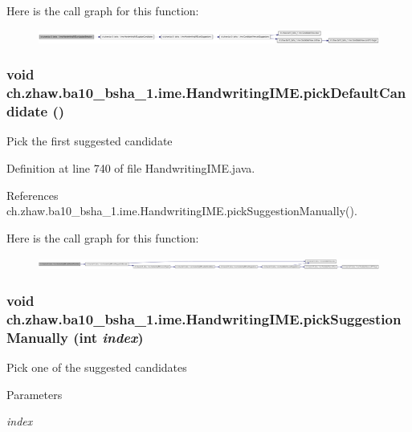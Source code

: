 Here is the call graph for this function:\nopagebreak
\begin{figure}[H]
\begin{center}
\leavevmode
\includegraphics[width=420pt]{classch_1_1zhaw_1_1ba10__bsha__1_1_1ime_1_1HandwritingIME_a372883c8da0f8e41f6acb0d169fc5b6e_cgraph}
\end{center}
\end{figure}
\hypertarget{classch_1_1zhaw_1_1ba10__bsha__1_1_1ime_1_1HandwritingIME_a6e2e375b97933b90f110199def80abfe}{
\subsubsection[{pickDefaultCandidate}]{\setlength{\rightskip}{0pt plus 5cm}void ch.zhaw.ba10\_\-bsha\_\-1.ime.HandwritingIME.pickDefaultCandidate ()}}
\label{classch_1_1zhaw_1_1ba10__bsha__1_1_1ime_1_1HandwritingIME_a6e2e375b97933b90f110199def80abfe}
Pick the first suggested candidate 

Definition at line 740 of file HandwritingIME.java.

References ch.zhaw.ba10\_\-bsha\_\-1.ime.HandwritingIME.pickSuggestionManually().

Here is the call graph for this function:\nopagebreak
\begin{figure}[H]
\begin{center}
\leavevmode
\includegraphics[width=420pt]{classch_1_1zhaw_1_1ba10__bsha__1_1_1ime_1_1HandwritingIME_a6e2e375b97933b90f110199def80abfe_cgraph}
\end{center}
\end{figure}
\hypertarget{classch_1_1zhaw_1_1ba10__bsha__1_1_1ime_1_1HandwritingIME_ada3cca347b6d9a39b3fb4d008d90dac8}{
\subsubsection[{pickSuggestionManually}]{\setlength{\rightskip}{0pt plus 5cm}void ch.zhaw.ba10\_\-bsha\_\-1.ime.HandwritingIME.pickSuggestionManually (int {\em index})}}
\label{classch_1_1zhaw_1_1ba10__bsha__1_1_1ime_1_1HandwritingIME_ada3cca347b6d9a39b3fb4d008d90dac8}
Pick one of the suggested candidates 
\begin{DoxyParams}{Parameters}
\item[{\em index}]\end{DoxyParams}


